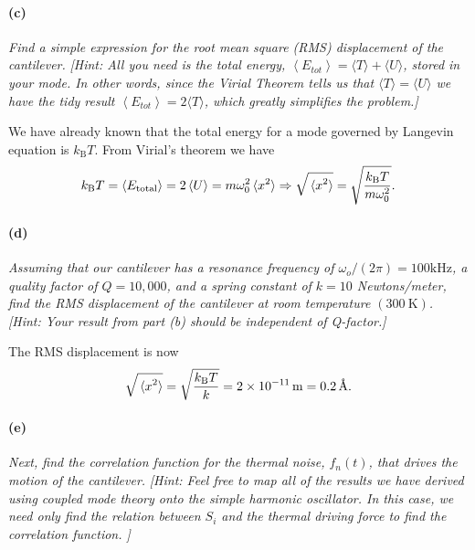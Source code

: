 \documentclass[hyperref, a4paper]{article}
\newcommand*{\kB}{k_{\text{B}}}
\begin{document}
\paragraph*{(c)} \textit{Find a simple expression for the root mean square (RMS) displacement of the cantilever.} 
\textit{[Hint: All you need is the total energy, $\left\langle E_{t o t}\right\rangle=\langle T\rangle+\langle U\rangle$, stored in your mode. In other words, since the Virial Theorem tells us that $\langle T\rangle=\langle U\rangle$ we have the tidy result $\left\langle E_{t o t}\right\rangle=2\langle T\rangle$, which greatly simplifies the problem.]}

We have already known that the total energy for a mode governed by Langevin equation is $\kB T$.
From Virial's theorem we have 
\begin{equation}
    \kB T = \expval{E_{\text{total}}} = 2 \expval{U} = m \omega_0^2 \expval*{x^2} \Rightarrow
    \sqrt{\expval*{x^2}} = \sqrt{\frac{\kB T}{m \omega_0^2}}.
\end{equation}

\paragraph*{(d)} \textit{Assuming that our cantilever has a resonance frequency of $\omega_o /(2 \pi)=100 \mathrm{kHz}$, a quality factor of $Q=10,000$, and a spring constant of $k=10$ Newtons/meter, find the RMS displacement of the cantilever at room temperature $(300 \mathrm{~K})$.} 
\textit{[Hint: Your result from part (b) should be independent of Q-factor.]}

The RMS displacement is now 
\begin{equation}
    \sqrt{\expval*{x^2}} = \sqrt{\frac{\kB T}{k}} = \SI{2e-11}{m} = \SI{0.2}{\angstrom}.
\end{equation}

\paragraph*{(e)} \textit{Next, find the correlation function for the thermal noise, $f_n(t)$, that drives the motion of the cantilever.} 
\textit{[Hint: Feel free to map all of the results we have derived using coupled mode theory onto the simple harmonic oscillator. In this case, we need only find the relation between $S_i$ and the thermal driving force to find the correlation function. ]}
\end{document}
